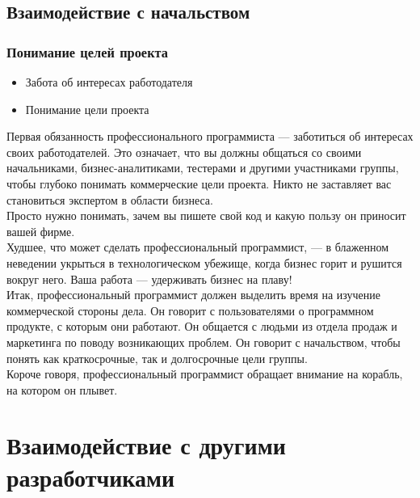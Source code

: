\documentclass{../industrial-development}
\begin{document}
\subsection{Взаимодействие с начальством}
\begin{frame} \frametitle{Понимание целей проекта}
\begin{itemize}
  \item Забота об интересах работодателя
  \item Понимание цели проекта
\end{itemize}
\end{frame}
\lecturenotes
Первая обязанность профессионального программиста — заботиться об интересах своих работодателей. Это означает, что вы должны общаться со своими начальниками, бизнес-аналитиками, тестерами и другими участниками группы, чтобы глубоко понимать коммерческие цели проекта. Никто не заставляет вас становиться экспертом в области бизнеса.\\
Просто нужно понимать, зачем вы пишете свой код и какую пользу он приносит вашей фирме.\\
Худшее, что может сделать профессиональный программист, — в блаженном неведении укрыться в технологическом убежище, когда бизнес горит и рушится вокруг него. Ваша работа — удерживать бизнес на плаву!\\
Итак, профессиональный программист должен выделить время на изучение коммерческой стороны дела. Он говорит с пользователями о программном продукте, с которым они работают. Он общается с людьми из отдела продаж и маркетинга по поводу возникающих проблем. Он говорит с начальством, чтобы понять как краткосрочные, так и долгосрочные цели группы.\\
Короче говоря, профессиональный программист обращает внимание на корабль, на котором он плывет.

\section{Взаимодействие с другими разработчиками}
\end{document}
